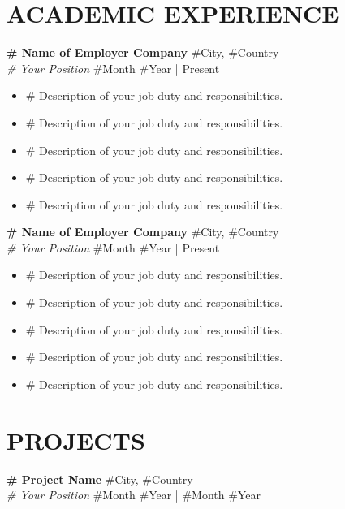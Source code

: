 \documentclass[a4paper,9pt]{extarticle}
\begin{document}
    \section*{ACADEMIC EXPERIENCE}
    \noindent
    \textbf{\# Name of Employer Company} \hfill \#City, \#Country\\ %
    \textit{\# Your Position} \hfill \#Month \#Year | Present %
    \begin{itemize}
        \item \# Description of your job duty and responsibilities.
        \item \# Description of your job duty and responsibilities.
        \item \# Description of your job duty and responsibilities.
        \item \# Description of your job duty and responsibilities.
        \item \# Description of your job duty and responsibilities.
    \end{itemize}

    \textbf{\# Name of Employer Company} \hfill \#City, \#Country\\ %
    \textit{\# Your Position} \hfill \#Month \#Year | Present %
    \begin{itemize}
        \item \# Description of your job duty and responsibilities.
        \item \# Description of your job duty and responsibilities.
        \item \# Description of your job duty and responsibilities.
        \item \# Description of your job duty and responsibilities.
        \item \# Description of your job duty and responsibilities.
    \end{itemize}

    \section*{PROJECTS}
    \noindent
    \textbf{\# Project Name} \hfill \#City, \#Country\\ %
    \textit{\# Your Position}
    \hfill \#Month \#Year | \#Month \#Year %
\end{document}
